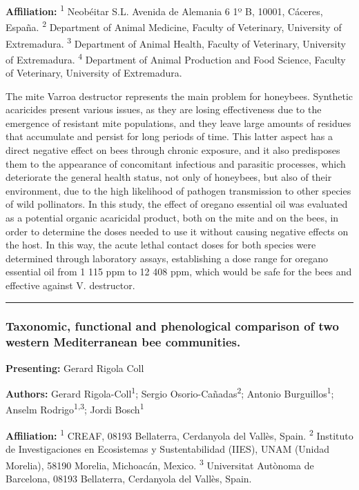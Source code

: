 \documentclass[
  letterpaper,
  DIV=11,
  numbers=noendperiod]{scrartcl}
\begin{document}
\textbf{Affiliation:} \textsuperscript{1} Neobéitar S.L. Avenida de
Alemania 6 1º B, 10001, Cáceres, España. \textsuperscript{2} Department
of Animal Medicine, Faculty of Veterinary, University of Extremadura.
\textsuperscript{3} Department of Animal Health, Faculty of Veterinary,
University of Extremadura. \textsuperscript{4} Department of Animal
Production and Food Science, Faculty of Veterinary, University of
Extremadura.

The mite Varroa destructor represents the main problem for honeybees.
Synthetic acaricides present various issues, as they are losing
effectiveness due to the emergence of resistant mite populations, and
they leave large amounts of residues that accumulate and persist for
long periods of time. This latter aspect has a direct negative effect on
bees through chronic exposure, and it also predisposes them to the
appearance of concomitant infectious and parasitic processes, which
deteriorate the general health status, not only of honeybees, but also
of their environment, due to the high likelihood of pathogen
transmission to other species of wild pollinators. In this study, the
effect of oregano essential oil was evaluated as a potential organic
acaricidal product, both on the mite and on the bees, in order to
determine the doses needed to use it without causing negative effects on
the host. In this way, the acute lethal contact doses for both species
were determined through laboratory assays, establishing a dose range for
oregano essential oil from 1 115 ppm to 12 408 ppm, which would be safe
for the bees and effective against V. destructor.

\begin{center}\rule{0.5\linewidth}{0.5pt}\end{center}

\subsubsection{Taxonomic, functional and phenological comparison of two
western Mediterranean bee
communities.}\label{taxonomic-functional-and-phenological-comparison-of-two-western-mediterranean-bee-communities.}

\textbf{Presenting:} Gerard Rigola Coll

\textbf{Authors:} Gerard Rigola-Coll\textsuperscript{1}; Sergio
Osorio-Cañadas\textsuperscript{2}; Antonio
Burguillos\textsuperscript{1}; Anselm Rodrigo\textsuperscript{1,3};
Jordi Bosch\textsuperscript{1}

\textbf{Affiliation:} \textsuperscript{1} CREAF, 08193 Bellaterra,
Cerdanyola del Vallès, Spain. \textsuperscript{2} Instituto de
Investigaciones en Ecosistemas y Sustentabilidad (IIES), UNAM (Unidad
Morelia), 58190 Morelia, Michoacán, Mexico. \textsuperscript{3}
Universitat Autònoma de Barcelona, 08193 Bellaterra, Cerdanyola del
Vallès, Spain.
\end{document}
